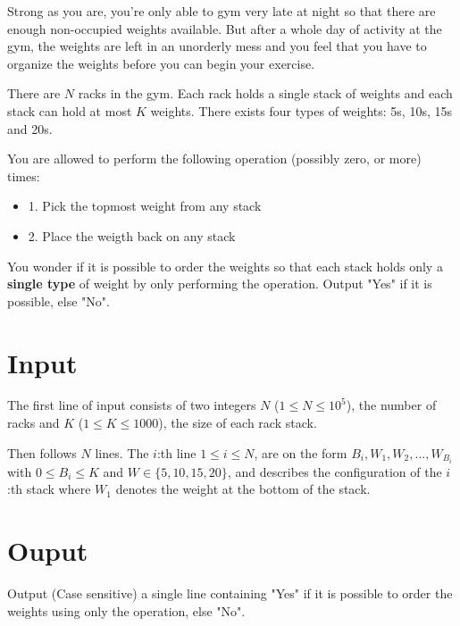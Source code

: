 
Strong as you are, you're only able to gym very late at night so that there are enough non-occupied weights available. 
But after a whole day of activity at the gym, the weights are left in an unorderly mess and you feel that you have to organize the weights before you can begin your exercise.

There are $N$ racks in the gym. Each rack holds a single stack of weights and each stack can hold at most $K$ weights. 
There exists four types of weights: 5s, 10s, 15s and 20s.

You are allowed to perform the following operation (possibly zero, or more) times:

\begin{itemize}
    \item{1. Pick the topmost weight from any stack}
    \item{2. Place the weigth back on any stack}
\end{itemize}


You wonder if it is possible to order the weights so that each stack holds only a \textbf{single type} of weight by only performing the operation. Output "Yes" if it is possible, else "No".

\section*{Input}
The first line of input consists of two integers $N$ ($1 \leq N \leq 10^5$), the number of racks and $K$ ($1 \leq K \leq 1000$), the size of each rack stack.

Then follows $N$ lines. The $i$:th line $1 \leq i \leq N$, are on the form $B_i, W_1, W_2, ..., W_{B_i}$ with $0 \leq B_i \leq K$ and $W \in \{5,10,15,20\}$, and describes the configuration of the $i$:th stack where $W_1$ denotes the weight at the bottom of the stack.
\section*{Ouput}
Output (Case sensitive) a single line containing "Yes" if it is possible to order the weights using only the operation, else "No".